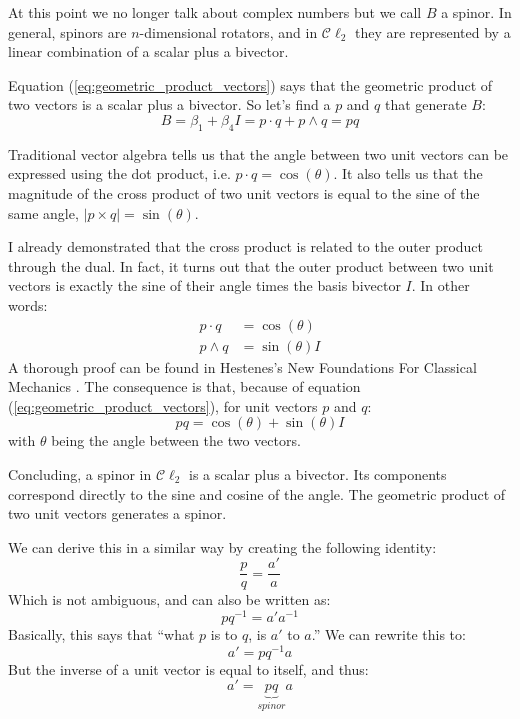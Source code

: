 \documentclass[10pt]{report}
\begin{document}
At this point we no longer talk about complex numbers but we call
$B$ a spinor. In general, spinors are $n$-dimensional rotators,
and in $\mathcal{C}\ell_2$ they are represented by a linear
combination of a scalar plus a bivector.

Equation (\ref{eq:geometric_product_vectors}) says that the
geometric product of two vectors is a scalar plus a bivector. So
let's find a $p$ and $q$ that generate $B$:
\begin{displaymath}
    B = \beta_1 + \beta_4I = p\cdot q + p\wedge q = pq
\end{displaymath}

Traditional vector algebra tells us that the angle between two
unit vectors can be expressed using the dot product, i.e. $p\cdot
q = \cos(\theta)$. It also tells us that the magnitude of the
cross product of two unit vectors is equal to the sine of the same
angle, $|p \times q| = \sin(\theta)$.

I already demonstrated that the cross product is related to the
outer product through the dual. In fact, it turns out that the
outer product between two unit vectors is exactly the sine of
their angle times the basis bivector $I$. In other words:
\begin{align*}
    p\cdot q &= \cos(\theta)    \\
    p\wedge q &= \sin(\theta)I
\end{align*}
A thorough proof can be found in Hestenes's New Foundations For
Classical Mechanics \cite{bib:hestenes new foundations}. The
consequence is that, because of equation
(\ref{eq:geometric_product_vectors}), for unit vectors $p$ and
$q$:
\begin{displaymath}
    pq = \cos(\theta) + \sin(\theta)I
\end{displaymath}
with $\theta$ being the angle between the two vectors.

Concluding, a spinor in $\mathcal{C}\ell_2$ is a scalar plus a
bivector. Its components correspond directly to the sine and
cosine of the angle. The geometric product of two unit vectors
generates a spinor.

We can derive this in a similar way by creating the following
identity:
\begin{displaymath}
    \frac{p}{q} = \frac{a'}{a}
\end{displaymath}
Which is not ambiguous, and can also be written as:
\begin{displaymath}
    pq^{-1} = a'a^{-1}
\end{displaymath}
 Basically, this says that ``what $p$ is to $q$, is $a'$ to
 $a$.'' We can rewrite this to:
\begin{displaymath}
    a' = pq^{-1}a
\end{displaymath}
But the inverse of a unit vector is equal to itself, and thus:
\begin{displaymath}
    a' = \underbrace{pq}_{spinor}a
\end{displaymath}
\end{document}

